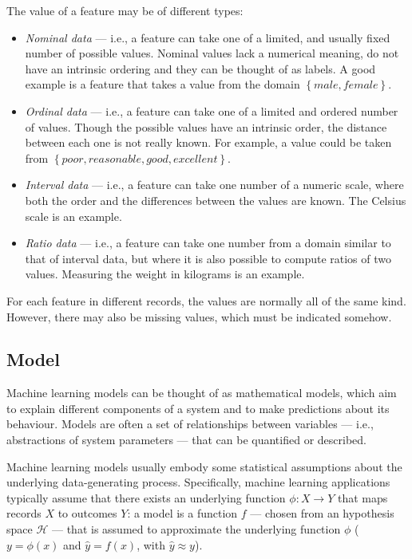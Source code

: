             The value of a feature may be of different types:
            \begin{itemize}
                \item \emph{Nominal data} --- i.e., a feature can take one of a limited, and usually fixed number of possible values. Nominal values lack a numerical meaning, do not have an intrinsic ordering and they can be thought of as labels. A good example is a feature that takes a value from the domain \(\left\{male, female\right\}\).
                \item \emph{Ordinal data} --- i.e., a feature can take one of a limited and ordered number of values. Though the possible values have an intrinsic order, the distance between each one is not really known. For example, a value could be taken from \(\left\{poor, reasonable, good, excellent\right\}\).
                \item \emph{Interval data} --- i.e., a feature can take one number of a numeric scale, where both the order and the differences between the values are known. The Celsius scale is an example.
                \item \emph{Ratio data} --- i.e., a feature can take one number from a domain similar to that of interval data, but where it is also possible to compute ratios of two values. Measuring the weight in kilograms is an example.
            \end{itemize}
            For each feature in different records, the values are normally all of the same kind. However, there may also be missing values, which must be indicated somehow.
        \subsection{Model}
            Machine learning models can be thought of as mathematical models, which aim to explain different components of a system and to make predictions about its behaviour. Models are often a set of relationships between variables --- i.e., abstractions of system parameters --- that can be quantified or described.
            
            Machine learning models usually embody some statistical assumptions about the underlying data-generating process. Specifically, machine learning applications typically assume that there exists an underlying function \(\phi : X \rightarrow Y\) that maps records \(X\) to outcomes \(Y\): a model is a function \(f\) --- chosen from an hypothesis space \(\mathcal{H}\) --- that is assumed to approximate the underlying function \(\phi\) (\(y=\phi\left(x\right)\) and \(\hat{y}=f\left(x\right)\), with \(\hat{y} \approx y\)).
            
